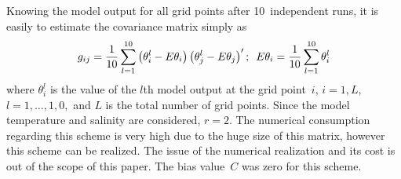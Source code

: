 \begin{multicols}{2}
Knowing the model output for all grid points after 10~independent runs, it 
is easily to estimate the covariance matrix simply as
$$ 
g_{ij} =\displaystyle\frac{\displaystyle 1\mathstrut}{\displaystyle 10\mathstrut} \sum\limits_{l=1}^{10}\left(\theta_{i}^{l}  -E\theta_{i} \right)
\left(\theta_{j}^{l} -E\theta_{j} \right)'; \enskip
E\theta_{i} =\displaystyle\frac{\displaystyle 1\mathstrut}{\displaystyle 10\mathstrut} \sum_{l=1}^{10}\theta_{i}^{l}  
$$
where  $\theta_{i}^{l} $ is the value of the $l$th model output at the grid point~$i$, 
$i=1,L$, $l=1,\ldots , 1,0,$ and $L$ is the total number of grid points. 
Since the model temperature and salinity are considered, $r=2$. 
The numerical consumption regarding this scheme is very high due to the huge size of this matrix, 
however this scheme can be realized. The issue of the numerical realization and its 
cost is out of the scope of this paper. The bias value~$C$ was zero for this scheme.


\end{multicols}
